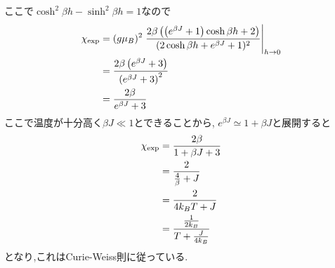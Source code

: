 \documentclass[uplatex,a4j,11pt,dvipdfmx]{jsarticle}
\begin{document}
ここで$\cosh^2\beta h-\sinh^2\beta h=1$なので
\begin{align}
  \begin{split}
    \chi_{\rm exp}&=(g\mu_B)^2\left.\frac{2\beta\left(\left(e^{\beta J}+1\right)\cosh\beta h+2\right)}{(2\cosh\beta h+e^{\beta J}+1)^2}\right|_{h\rightarrow0}\\
    &=\frac{2\beta\left(e^{\beta J}+3\right)}{\left(e^{\beta J}+3\right)^2}\\
    &=\frac{2\beta}{e^{\beta J}+3}
  \end{split}
\end{align}
ここで温度が十分高く$\beta J\ll1$とできることから,
$e^{\beta J}\simeq1+\beta J$と展開すると
\begin{align}
  \begin{split}
    \chi_{\rm exp}&=\frac{2\beta}{1+\beta J+3}\\
    &=\frac{2}{\frac{4}{\beta}+J}\\
    &=\frac{2}{4k_BT+J}\\
    &=\frac{\frac{1}{2k_B}}{T+\frac{J}{4k_B}}
  \end{split}
\end{align}
となり,これはCurie-Weiss則に従っている.
\newpage
\end{document}

